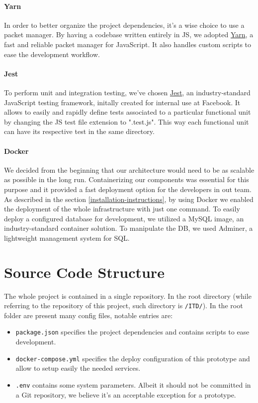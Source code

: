 \documentclass[
]{article}
\begin{document}
\hypertarget{yarn}{%
\paragraph{Yarn}\label{yarn}}

In order to better organize the project dependencies, it's a wise choice
to use a packet manager. By having a codebase written entirely in JS, we
adopted \href{https://yarnpkg.com/}{Yarn}, a fast and reliable packet
manager for JavaScript. It also handles custom scripts to ease the
development workflow.

\hypertarget{jest}{%
\paragraph{Jest}\label{jest}}

To perform unit and integration testing, we've chosen
\href{https://jestjs.io/}{Jest}, an industry-standard JavaScript testing
framework, initally created for internal use at Facebook. It allows to easily and rapidly define tests associated to a particular functional unit by changing the JS test file extension to ".test.js". This way each functional unit can have its respective test in the same directory.

\hypertarget{docker}{%
\paragraph{Docker}\label{docker}}
We decided from the beginning that our architecture would need to be as scalable as possible in the long run.
Containerizing our components was essential for this purpose and it provided a fast deployment option for the developers in out team. 
As described in the section \ref{installation-instructions}, by using Docker we enabled the deployment of the whole infrastructure with just one command.
To easily deploy a configured database for development, we utilized a MySQL image, an industry-standard container solution.
To manipulate the DB, we used Adminer, a lightweight management system for SQL.

\hypertarget{source-code-structure}{%
\section{Source Code Structure}\label{source-code-structure}}

The whole project is contained in a single repository. In the root directory (while referring to the repository of this project, such directory is \texttt{/ITD/}). In the root folder are present many config files, notable entries are:
\begin{itemize}
  \item \texttt{package.json} specifies the project dependencies and contains scripts to ease development.
  \item \texttt{docker-compose.yml} specifies the deploy configuration of this prototype and allow to setup easily the needed services.
  \item \texttt{.env} contains some system parameters. Albeit it should not be committed in a Git repository, we believe it's an acceptable exception for a prototype.
\end{itemize}
\end{document}
